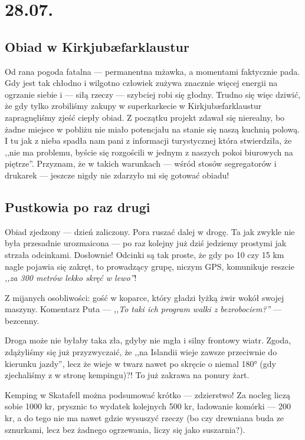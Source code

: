\chapter*{28.07.}

\section*{Obiad w Kirkjubæfarklaustur}

Od rana pogoda fatalna --- permanentna mżawka, a momentami faktycznie pada. Gdy jest tak chłodno i wilgotno człowiek zużywa znacznie więcej energii na ogrzanie siebie i --- siłą rzeczy --- szybciej robi się głodny. Trudno się więc dziwić, że gdy tylko zrobiliśmy zakupy w superkarkecie w Kirkjubæfarklaustur zapragnęliśmy zjeść ciepły obiad. Z początku projekt zdawał się nierealny, bo żadne miejsce w pobliżu nie miało potencjału na stanie się naszą kuchnią polową. I tu jak z nieba spadła nam pani z informacji turystycznej która stwierdziła, że ,,nie ma problemu, byście się rozgościli w jednym z naszych pokoi biurowych na piętrze''. Przyznam, że w takich warunkach --- wśród stosów segregatorów i drukarek --- jeszcze nigdy nie zdarzyło mi się gotować obiadu!


\section*{Pustkowia po raz drugi}

Obiad zjedzony --- dzień zaliczony. Pora ruszać dalej w drogę. Ta jak zwykle nie była przesadnie urozmaicona --- po raz kolejny już dziś jedziemy prostymi jak strzała odcinkami. Dosłownie! Odcinki są tak proste, że gdy po 10 czy 15 km nagle pojawia się zakręt, to prowadzący grupę, niczym GPS, komunikuje reszcie \emph{,,za 300 metrów lekko skręć w lewo''}!

Z mijanych osobliwości: gość w koparce, który gładzi łyżką żwir wokół swojej maszyny. Komentarz Puta --- \emph{,,To taki ich program walki z bezrobociem?''} --- bezcenny.


Droga może nie byłaby taka zła, gdyby nie mgła i silny frontowy wiatr. Zgoda, zdążyliśmy się już przyzwyczaić, że ,,na Islandii wieje zawsze przeciwnie do kierunku jazdy'', lecz że wieje w twarz nawet po skręcie o niemal 180° (gdy zjechaliśmy z  w stronę kempingu)?! To już zakrawa na ponury żart.


Kemping w Skatafell można podsumować krótko --- zdzierstwo! Za nocleg liczą sobie 1000 kr, prysznic to wydatek kolejnych 500 kr, ładowanie komórki --- 200 kr, a do tego nie ma nawet gdzie wysuszyć rzeczy (bo czy drewniana buda ze sznurkami, lecz bez żadnego ogrzewania, liczy się jako suszarnia?).
